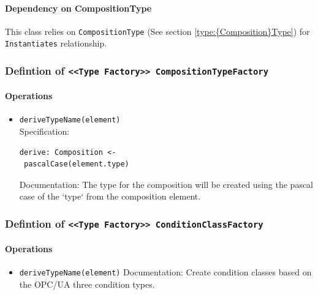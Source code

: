 \paragraph{Dependency on {Composition}Type}

This class relies on \texttt{{Composition}Type} (See section \ref{type:{Composition}Type}) for \texttt{Instantiates} relationship.

\FloatBarrier
\subsubsection{Defintion of \texttt{<<Type Factory>> CompositionTypeFactory}} \label{type:CompositionTypeFactory}

\FloatBarrier



\paragraph{Operations}
\begin{itemize}
  \item \texttt{deriveTypeName(element)}\\
    Specification:
   \indent \begin{Verbatim}[xleftmargin=.25in,fontsize=\small]
derive: Composition <-
 pascalCase(element.type)
\end{Verbatim}

    Documentation: The type for the composition will be created using the pascal case of the `type` from the composition element.

\end{itemize}
\FloatBarrier
\subsubsection{Defintion of \texttt{<<Type Factory>> ConditionClassFactory}} \label{type:ConditionClassFactory}

\FloatBarrier



\paragraph{Operations}
\begin{itemize}
  \item \texttt{deriveTypeName(element)}
    Documentation: Create condition classes based on the OPC/UA three condition  types.

\end{itemize}
\FloatBarrier
